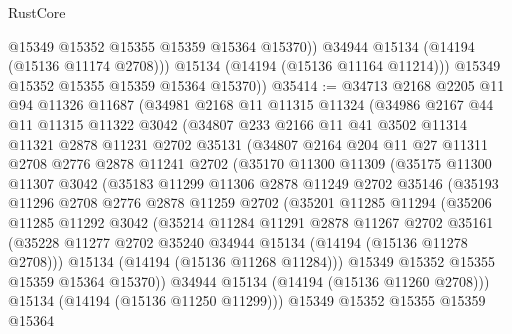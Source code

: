 \begin{lexlean}{RustCore}
\begin{coremodule}
                @15349
                @15352
                @15355
                @15359
                @15364
                @15370))
            @34944
            @15134
            (@14194 (@15136 @11174 @2708)))
          @15134
          (@14194 (@15136 @11164 @11214)))
        @15349
        @15352
        @15355
        @15359
        @15364
        @15370))
@35414 := @34713
    @2168
    @2205
    @11
    @94
    @11326
    @11687
    (@34981
      @2168
      @11
      @11315
      @11324
      (@34986
        @2167
        @44
        @11
        @11315
        @11322
        @3042
        (@34807
          @233
          @2166
          @11
          @41
          @3502
          @11314
          @11321
          @2878
          @11231
          @2702
          @35131
          (@34807
            @2164
            @204
            @11
            @27
            @11311
            @2708
            @2776
            @2878
            @11241
            @2702
            (@35170
              @11300
              @11309
              (@35175
                @11300
                @11307
                @3042
                (@35183
                  @11299
                  @11306
                  @2878
                  @11249
                  @2702
                  @35146
                  (@35193
                    @11296
                    @2708
                    @2776
                    @2878
                    @11259
                    @2702
                    (@35201
                      @11285
                      @11294
                      (@35206
                        @11285
                        @11292
                        @3042
                        (@35214
                          @11284
                          @11291
                          @2878
                          @11267
                          @2702
                          @35161
                          (@35228 @11277 @2702 @35240 @34944 @15134 (@14194 (@15136 @11278 @2708)))
                          @15134
                          (@14194 (@15136 @11268 @11284)))
                        @15349
                        @15352
                        @15355
                        @15359
                        @15364
                        @15370))
                    @34944
                    @15134
                    (@14194 (@15136 @11260 @2708)))
                  @15134
                  (@14194 (@15136 @11250 @11299)))
                @15349
                @15352
                @15355
                @15359
                @15364

\end{coremodule}
\end{lexlean}
